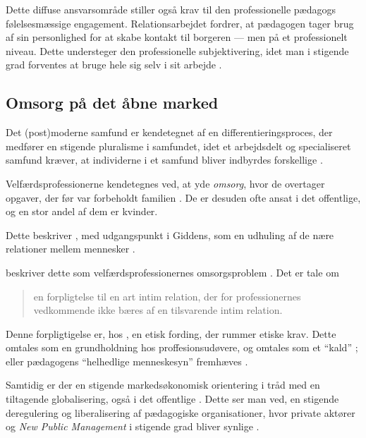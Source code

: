 Dette diffuse ansvarsområde stiller også krav til den professionelle pædagogs følelsesmæssige engagement. Relationsarbejdet fordrer, at pædagogen tager brug af sin personlighed for at skabe kontakt til borgeren — men på et professionelt niveau. Dette understeger den professionelle subjektivering, idet man i stigende grad forventes at bruge hele sig selv i sit arbejde \autocite[s. 71f]{mik-meyerIndledningSkabeProfessionel2012}.

\subsection{Omsorg på det åbne marked}
Det (post)moderne samfund er kendetegnet af en differentieringsproces, der medfører en stigende pluralisme i samfundet, idet et arbejdsdelt og specialiseret samfund kræver, at individerne i et samfund bliver indbyrdes forskellige \autocite[s. 32f]{hansbolKonstruktionAfProfessionel2008}.

Velfærdsprofessionerne kendetegnes ved, at yde \textit{omsorg}, hvor de overtager opgaver, der før var forbeholdt familien \autocite[s. 445]{frederiksenVelfaerdsprofessionerMellemOmsorg2017}.
De er desuden ofte ansat i det offentlige, og en stor andel af dem er kvinder.

Dette beskriver \citeauthor{kofodOrganisationOgLedelse2016}, med udgangspunkt i Giddens, som en udhuling af de nære relationer mellem mennesker \autocite[s 157]{kofodOrganisationOgLedelse2016}.

\citeauthor{frederiksenVelfaerdsprofessionerMellemOmsorg2017} beskriver dette som velfærdsprofessionernes omsorgsproblem \autocite[s.455ff]{frederiksenVelfaerdsprofessionerMellemOmsorg2017}.
Det er tale om
\begin{quote}
  \lodts en forpligtelse til en art intim relation, der for professionernes vedkommende ikke bæres af en tilsvarende intim relation. \autocite[s. 456]{frederiksenVelfaerdsprofessionerMellemOmsorg2017}
\end{quote}

Denne forpligtigelse er, hos \citeauthor{frederiksenVelfaerdsprofessionerMellemOmsorg2017}, en etisk fording, der rummer etiske krav.
Dette omtales som en grundholdning hos proffesionsudøvere, og omtales som et “kald” \autocite[s. 457]{frederiksenVelfaerdsprofessionerMellemOmsorg2017}; eller pædagogens “helhedlige menneskesyn” fremhæves \autocite{socialpaedagogerneSocialpaedagogiskeKernefaglighed2015}. 

Samtidig er der en stigende markedsøkonomisk orientering i tråd med en tiltagende globalisering, også i det offentlige \autocite[s. 161]{kofodOrganisationOgLedelse2016}.
Dette ser man ved, en stigende deregulering og liberalisering af pædagogiske organisationer, hvor private aktører og \textit{New Public Management} i stigende grad bliver synlige \autocite[s. 161]{kofodOrganisationOgLedelse2016}.

